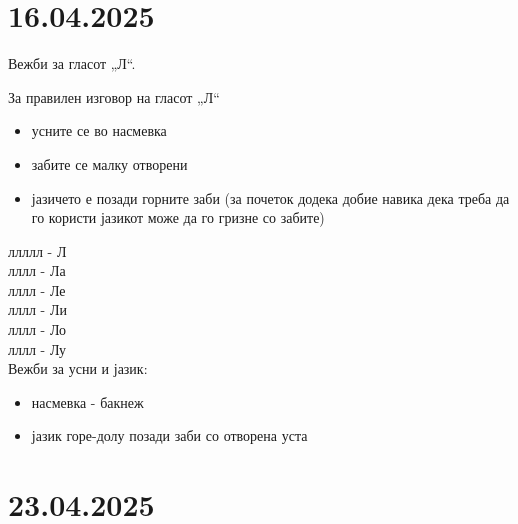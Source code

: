 \documentclass[a5paper,12pt]{article}
\newenvironment{instruction}{%
  \begin{tcolorbox}[colback=white,colframe=accentcolor,title={\textbf{Инструкции}},fonttitle=\bfseries] 
}{%
  \end{tcolorbox}
}
\begin{document}
\section{16.04.2025}
Вежби за гласот „Л“. 

\begin{instruction}
За правилен изговор на гласот „Л“
\begin{itemize}
  \item усните се во насмевка
  \item забите се малку отворени 
  \item јазичето е позади горните заби (за почеток додека добие навика дека треба да го користи јазикот може да го гризне со забите)
\end{itemize}
\end{instruction}

\noindent
ллллл - Л\\
лллл - Ла\\
лллл - Ле\\
лллл - Ли\\
лллл - Ло\\
лллл - Лу\\

Вежби за усни и јазик:

\begin{itemize}
  \item насмевка - бакнеж 
  \item јазик горе-долу позади заби со отворена уста
\end{itemize}

\section{23.04.2025}
\end{document}
